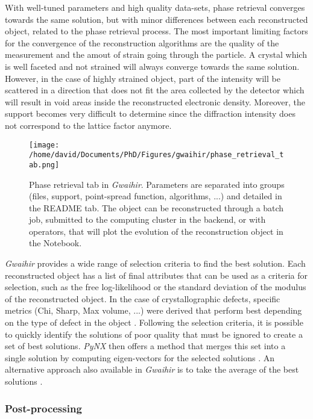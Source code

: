 With well-tuned parameters and high quality data-sets, phase retrieval converges towards the same solution, but with minor differences between each reconstructed object, related to the phase retrieval process.
The most important limiting factors for the convergence of the reconstruction algorithms are the quality of the measurement and the amout of strain going through the particle.
A crystal which is well faceted and not strained will always converge towards the same solution.
However, in the case of highly strained object, part of the intensity will be scattered in a direction that does not fit the area collected by the detector which will result in void areas inside the reconstructed electronic density.
Moreover, the support becomes very difficult to determine since the diffraction intensity does not correspond to the lattice factor anymore.

\begin{figure}[!htb]
    \centering
    \texttt{[image: /home/david/Documents/PhD/Figures/gwaihir/phase\_retrieval\_tab.png]}
    \caption{Phase retrieval tab in \textit{Gwaihir}. Parameters are separated into groups (files, support, point-spread function, algorithms, ...) and detailed in the README tab. The object can be reconstructed through a batch job, submitted to the computing cluster in the backend, or with operators, that will plot the evolution of the reconstruction object in the Notebook.}
    \label{fig:PRT}
\end{figure}

\textit{Gwaihir} provides a wide range of selection criteria to find the best solution.
Each reconstructed object has a list of final attributes that can be used as a criteria for selection, such as the free log-likelihood \parencite{pynx2020FLLK} or the standard deviation of the modulus of the reconstructed object.
In the case of crystallographic defects, specific metrics (Chi, Sharp, Max volume, ...) were derived that perform best depending on the type of defect in the object \parencite{Ulvestad2017}.
Following the selection criteria, it is possible to quickly identify the solutions of poor quality that must be ignored to create a set of best solutions.
\textit{PyNX} then offers a method that merges this set into a single solution by computing eigen-vectors for the selected solutions \parencite{pynx2020FLLK}.
An alternative approach also available in \textit{Gwaihir} is to take the average of the best solutions \parencite{ulvestad_nanoscale_2014}.

\subsubsection{Post-processing}

